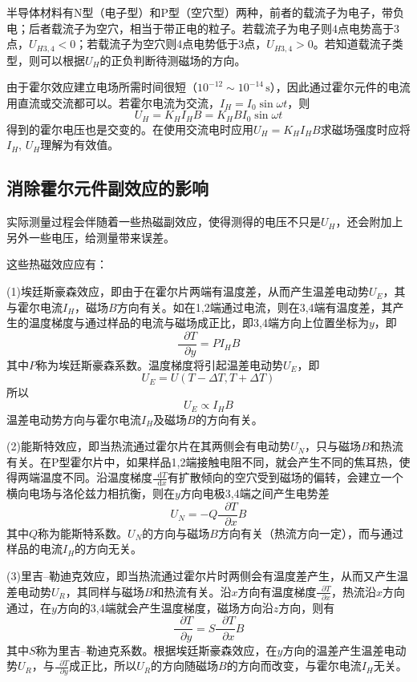 \documentclass[UTF-8,twoside,cs4size]{ctexart}
\newcommand*{\mpar}{\mathop{}\!\partial}
\newcommand*{\dif}{\mathop{}\!\mathrm{d}}
\begin{document}
	半导体材料有N型（电子型）和P型（空穴型）两种，前者的载流子为电子，带负电；后者载流子为空穴，相当于带正电的粒子。若载流子为电子则4点电势高于3点，$ U_{H3,4}<0 $；若载流子为空穴则4点电势低于3点，$ U_{H3,4}>0 $。若知道载流子类型，则可以根据$ U_H $的正负判断待测磁场的方向。
	
	由于霍尔效应建立电场所需时间很短（$ 10^{-12}\sim10^{-14}\,\mathrm s $），因此通过霍尔元件的电流用直流或交流都可以。若霍尔电流为交流，$ I_H=I_0\sin\omega t $，则
	\[U_H=K_HI_HB=K_HBI_0\sin\omega t\]
	得到的霍尔电压也是交变的。在使用交流电时应用$ U_H=K_HI_HB $求磁场强度时应将$ I_H,\,U_H $理解为有效值。
	
	\subsection{消除霍尔元件副效应的影响}
	实际测量过程会伴随着一些热磁副效应，使得测得的电压不只是$ U_H $，还会附加上另外一些电压，给测量带来误差。
	
	这些热磁效应应有：	
	
	{\kaishu (1)埃廷斯豪森效应，即由于在霍尔片两端有温度差，从而产生温差电动势$ U_E $，其与霍尔电流$ I_H $，磁场$ B $方向有关。如在1,2端通过电流，则在3,4端有温度差，其产生的温度梯度与通过样品的电流与磁场成正比，即3,4端方向上位置坐标为$ y $，即
	\[\frac{\mpar T}{\mpar y}=PI_HB\]
	其中$ P $称为埃廷斯豪森系数。温度梯度将引起温差电动势$ U_E $，即
	\[U_E=U(T-\Delta T,T+\Delta T)\]
	所以
	\[U_E\propto I_HB\]
	温差电动势方向与霍尔电流$ I_H $及磁场$ B $的方向有关。}
	
	{\kaishu (2)能斯特效应，即当热流通过霍尔片在其两侧会有电动势$ U_N $，只与磁场$ B $和热流有关。在P型霍尔片中，如果样品1,2端接触电阻不同，就会产生不同的焦耳热，使得两端温度不同。沿温度梯度$ \frac{\dif T}{\dif x} $有扩散倾向的空穴受到磁场的偏转，会建立一个横向电场与洛伦兹力相抗衡，则在$ y $方向电极3,4端之间产生电势差
	\[U_N=-Q\frac{\mpar T}{\mpar x}B\]
	其中$ Q $称为能斯特系数。$ U_N $的方向与磁场$ B $方向有关（热流方向一定），而与通过样品的电流$ I_H $的方向无关。}
	
	{\kaishu (3)里吉--勒迪克效应，即当热流通过霍尔片时两侧会有温度差产生，从而又产生温差电动势$ U_R $，其同样与磁场$ B $和热流有关。沿$ x $方向有温度梯度$ \frac{\mpar T}{\mpar x} $，热流沿$ x $方向通过，在$ y $方向的3,4端就会产生温度梯度，磁场方向沿$ z $方向，则有
	\[\frac{\mpar T}{\mpar y}=S\frac{\mpar T}{\mpar x}B\]
	其中$ S $称为里吉--勒迪克系数。根据埃廷斯豪森效应，在$ y $方向的温差产生温差电动势$ U_R $，与$ \frac{\mpar T}{\mpar y} $成正比，所以$ U_R $的方向随磁场$ B $的方向而改变，与霍尔电流$ I_H $无关。}
\end{document}
